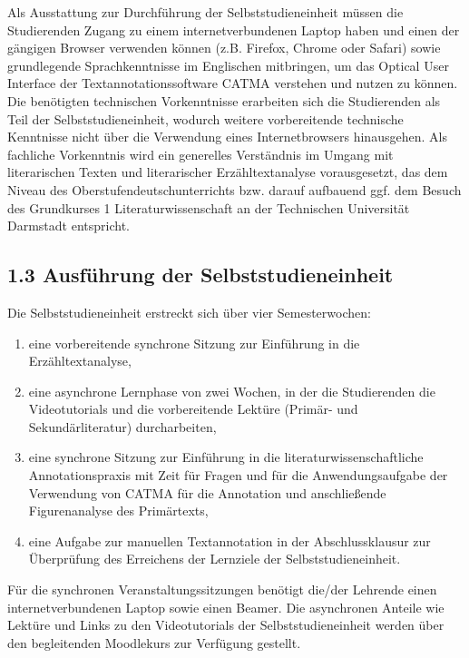 \documentclass[
          a4paper,
        ]{article}
\providecommand{\tightlist}{%
  \setlength{\itemsep}{0pt}\setlength{\parskip}{0pt}}
\begin{document}
Als Ausstattung zur Durchführung der Selbststudieneinheit müssen die
Studierenden Zugang zu einem internetverbundenen Laptop haben und einen
der gängigen Browser verwenden können (z.B. Firefox, Chrome oder Safari)
sowie grundlegende Sprachkenntnisse im Englischen mitbringen, um das
Optical User Interface der Textannotationssoftware CATMA verstehen und
nutzen zu können. Die benötigten technischen Vorkenntnisse erarbeiten
sich die Studierenden als Teil der Selbststudieneinheit, wodurch weitere
vorbereitende technische Kenntnisse nicht über die Verwendung eines
Internetbrowsers hinausgehen. Als fachliche Vorkenntnis wird ein
generelles Verständnis im Umgang mit literarischen Texten und
literarischer Erzähltextanalyse vorausgesetzt, das dem Niveau des
Oberstufendeutschunterrichts bzw. darauf aufbauend ggf. dem Besuch des
Grundkurses 1 Literaturwissenschaft an der Technischen Universität
Darmstadt entspricht.

\subsection{1.3 Ausführung der
Selbststudieneinheit}\label{ausfuxfchrung-der-selbststudieneinheit}

Die Selbststudieneinheit erstreckt sich über vier Semesterwochen:

\begin{enumerate}
\def\labelenumi{\arabic{enumi}.}
\tightlist
\item
  eine vorbereitende synchrone Sitzung zur Einführung in die
  Erzähltextanalyse,
\item
  eine asynchrone Lernphase von zwei Wochen, in der die Studierenden die
  Videotutorials und die vorbereitende Lektüre (Primär- und
  Sekundärliteratur) durcharbeiten,
\item
  eine synchrone Sitzung zur Einführung in die
  literaturwissenschaftliche Annotationspraxis mit Zeit für Fragen und
  für die Anwendungsaufgabe der Verwendung von CATMA für die Annotation
  und anschließende Figurenanalyse des Primärtexts,
\item
  eine Aufgabe zur manuellen Textannotation in der Abschlussklausur zur
  Überprüfung des Erreichens der Lernziele der Selbststudieneinheit.
\end{enumerate}

Für die synchronen Veranstaltungssitzungen benötigt die/der Lehrende
einen internetverbundenen Laptop sowie einen Beamer. Die asynchronen
Anteile wie Lektüre und Links zu den Videotutorials der
Selbststudieneinheit werden über den begleitenden Moodlekurs zur
Verfügung gestellt.
\end{document}
